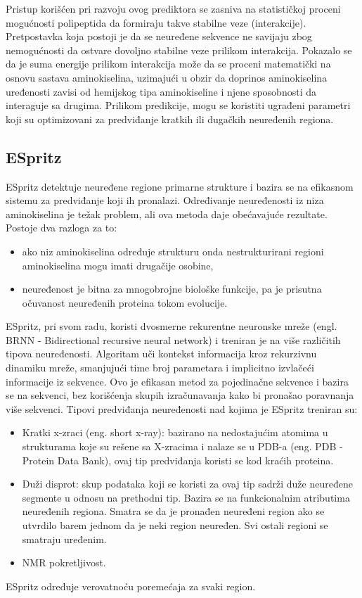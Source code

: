 Pristup korišćen pri razvoju ovog prediktora se zasniva na statističkoj proceni mogućnosti polipeptida da formiraju takve stabilne veze (interakcije). Pretpostavka koja postoji je da se neuređene sekvence ne savijaju zbog nemogućnosti da ostvare dovoljno stabilne veze prilikom interakcija. Pokazalo se da je suma energije prilikom interakcija može da se proceni matematički na osnovu sastava aminokiselina, uzimajući u obzir da doprinos aminokiselina uređenosti zavisi od hemijskog tipa aminokiseline i njene sposobnosti da interaguje sa drugima. Prilikom predikcije, mogu se koristiti ugrađeni parametri koji su optimizovani za predviđanje kratkih ili dugačkih neuređenih regiona. ~\cite{IUPred, IUPred1, IUPred2, IUPred3}

 
\subsection{ESpritz}
ESpritz detektuje neuređene regione primarne strukture i bazira se na efikasnom sistemu za predviđanje koji ih pronalazi. Određivanje neuređenosti iz niza aminokiselina je težak problem, ali ova metoda daje obećavajuće rezultate. Postoje dva razloga za to:
\begin{itemize}
\item  ako niz aminokiselina određuje strukturu onda nestrukturirani regioni aminokiselina mogu imati drugačije osobine, 
\item neuređenost je bitna za mnogobrojne biološke funkcije, pa je prisutna očuvanost neuređenih proteina tokom evolucije. 
\end{itemize}

ESpritz, pri svom radu, koristi dvosmerne rekurentne neuronske mreže (engl. BRNN - Bidirectional recursive neural network) i treniran je na više različitih tipova neuređenosti. Algoritam uči kontekst informacija kroz rekurzivnu dinamiku mreže, smanjujući time broj parametara i implicitno izvlačeći informacije iz sekvence. Ovo je efikasan metod za pojedinačne sekvence i bazira se na sekvenci, bez korišćenja skupih izračunavanja kako bi pronašao poravnanja više sekvenci. Tipovi predviđanja neuređenosti nad kojima je ESpritz treniran su:
\begin{itemize}
\item Kratki x-zraci (eng. short x-ray): bazirano na nedostajućim atomima u strukturama koje su rešene sa X-zracima i nalaze se u PDB-a (eng. PDB - Protein Data Bank), ovaj tip predviđanja koristi se kod kraćih proteina. 
\item Duži disprot: skup podataka koji se koristi za ovaj tip sadrži duže neuređene segmente u odnosu na prethodni tip. Bazira se na funkcionalnim atributima neuređenih regiona. Smatra se da je pronađen neuređeni region ako se utvrdilo barem jednom da je neki region neuređen. Svi ostali regioni se smatraju uređenim.
\item NMR pokretljivost.
\end{itemize}
ESpritz određuje verovatnoću poremećaja za svaki region. ~\cite{ESpritzAFPD, ESpritzEP, ESpritz2, ESpritz3}

